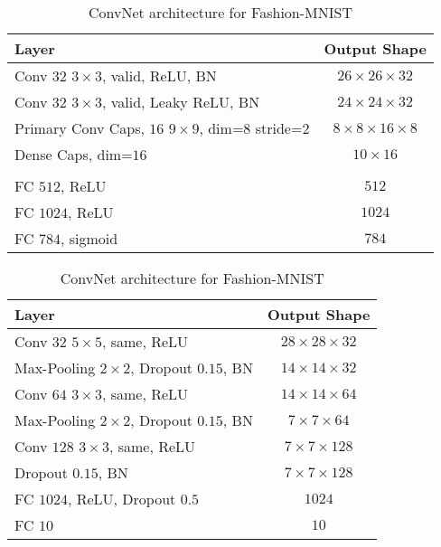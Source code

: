 \begin{table}
	\centering
	
	\begin{tabular}{lc}
		\toprule
		Layer	& Output Shape \\ 
		\midrule 
		Conv $32$ $3\times3$, valid, ReLU, BN	&  $26\times26\times32$ \\ 
		\midrule 
		Conv $32$ $3\times3$, valid, Leaky ReLU, BN	&  $24\times24\times32$\\ 
		\midrule 
		Primary Conv Caps, $16$ $9\times9$, dim=$8$	stride=$2$ &  $8\times8\times16\times8$\\ 
		\midrule 
		Dense Caps, dim=$16$	&  $10\times16$\\ 
		\midrule 
		& \\
		\midrule
		FC $512$, ReLU	& $512$ \\
		\midrule
		FC $1024$, ReLU	& $1024$ \\
		\midrule
		FC $784$, sigmoid & $784$ \\
		\bottomrule
	\end{tabular}
	\caption{CapsNet architecture for Fashion-MNIST}
	\label{tab:capsnet:fashion}
	
	\vspace{0.75cm}
	
	\begin{tabular}{lc}
		\toprule 
		Layer	&  Output Shape \\ 
		\midrule
		Conv $32$ $5\times5$, same,	ReLU & $28\times28\times32$ \\ 
		\midrule
		Max-Pooling $2\times2$, Dropout $0.15$, BN	&  $14\times14\times32$ \\ 
		\midrule 
		Conv $64$ $3\times3$, same, ReLU	& $14\times14\times64$ \\ 
		\midrule 
		Max-Pooling $2\times2$, Dropout $0.15$, BN	& $7\times7\times64$ \\
		\midrule
		Conv $128$ $3\times3$, same, ReLU	& $7\times7\times128$ \\
		\midrule
		Dropout $0.15$, BN	& $7\times7\times128$ \\
		\midrule
		FC $1024$, ReLU, Dropout $0.5$ & $1024$ \\
		\midrule
		FC $10$ & $10$\\
		\bottomrule
	\end{tabular} 
	\caption{ConvNet architecture for Fashion-MNIST}
	\label{tab:convnet:fashion}
\end{table}


